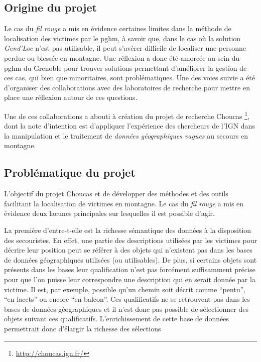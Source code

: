 \subsection{Origine du projet}
\label{subsec:1-2-1}

Le cas du \emph{fil rouge} a mis en évidence certaines limites dans la
méthode de localisation des victimes par le \ac{pghm}, à savoir que,
dans le cas où la solution \emph{Gend'Loc} n'est pas utilisable, il
peut s'avérer difficile de localiser une personne perdue ou blessée en
montagne. Une réflexion a donc été amorcée au sein du \ac{pghm} du
Grenoble pour trouver solutions permettant d'améliorer la gestion de
ces cas, qui bien que minoritaires, sont problématiques. Une des voies
suivie a été d'organiser des collaborations avec des laboratoires de
recherche pour mettre en place une réflexion autour de ces questions.

Une de ces collaborations a abouti à création du projet de recherche
Choucas \footnote{\url{http://choucas.ign.fr/}}, dont la note
d'intention est d'appliquer l'expérience des chercheurs de l'IGN dans
la manipulation et le traitement de \emph{données géographiques
  vagues} au secours en montagne. 

\subsection{Problématique du projet}
\label{subsec:1-2-2}

L'objectif du projet Choucas et de développer des méthodes et des
outils facilitant la localisation de victimes en montagne. Le cas du
\emph{fil rouge} a mis en évidence deux lacunes principales sur
lesquelles il est possible d'agir.

La première d'entre-t-elle est la richesse sémantique des données à la
disposition des secouristes. En effet, une partie des descriptions
utilisées par les victimes pour décrire leur position peut se référer
à des objets qui n'existent pas dans les bases de données
géographiques utilisées (ou utilisables). De plus, si certains objets
sont présents dans les bases leur qualification n'est pas forcément
suffisamment précise pour que l'on puisse leur correspondre une
description qui en serait donnée par la victime. Il est, par exemple,
possible qu'un chemin soit décrit comme \enquote{pentu}, \enquote{en
  lacets} ou encore \enquote{en balcon}. Ces qualificatifs ne se
retrouvent pas dans les bases de données géographiques et il n'est
donc pas possible de sélectionner des objets suivant ces
qualificatifs. L'enrichissement de cette base de données permettrait
donc d'élargir la richesse des sélections

